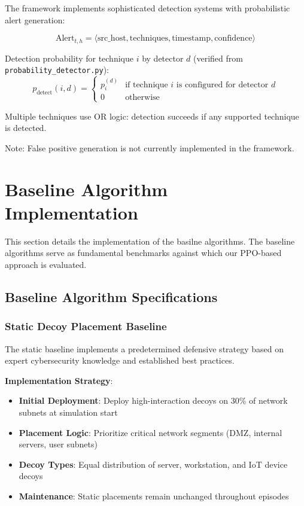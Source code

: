 \documentclass[12pt,oneside]{article}
\begin{document}
The framework implements sophisticated detection systems with probabilistic alert generation:

\begin{equation}
\text{Alert}_{t,h} = \langle \text{src\_host}, \text{techniques}, \text{timestamp}, \text{confidence} \rangle
\end{equation}

Detection probability for technique $i$ by detector $d$ (verified from \texttt{probability\_detector.py}):
\begin{equation}
p_{\text{detect}}(i, d) = \begin{cases}
p_i^{(d)} & \text{if technique } i \text{ is configured for detector } d \\
0 & \text{otherwise}
\end{cases}
\end{equation}

Multiple techniques use OR logic: detection succeeds if any supported technique is detected.

Note: False positive generation is not currently implemented in the framework.


\clearpage

\section{Baseline Algorithm Implementation}

This section details the implementation of the basilne algorithms. The baseline algorithms serve as fundamental benchmarks against which our PPO-based approach is evaluated.

\subsection{Baseline Algorithm Specifications}

\subsubsection{Static Decoy Placement Baseline}

The static baseline implements a predetermined defensive strategy based on expert cybersecurity knowledge and established best practices.

\textbf{Implementation Strategy}:
\begin{itemize}
    \item \textbf{Initial Deployment}: Deploy high-interaction decoys on 30\% of network subnets at simulation start
    \item \textbf{Placement Logic}: Prioritize critical network segments (DMZ, internal servers, user subnets)
    \item \textbf{Decoy Types}: Equal distribution of server, workstation, and IoT device decoys
    \item \textbf{Maintenance}: Static placements remain unchanged throughout episodes
\end{itemize}
\end{document}

